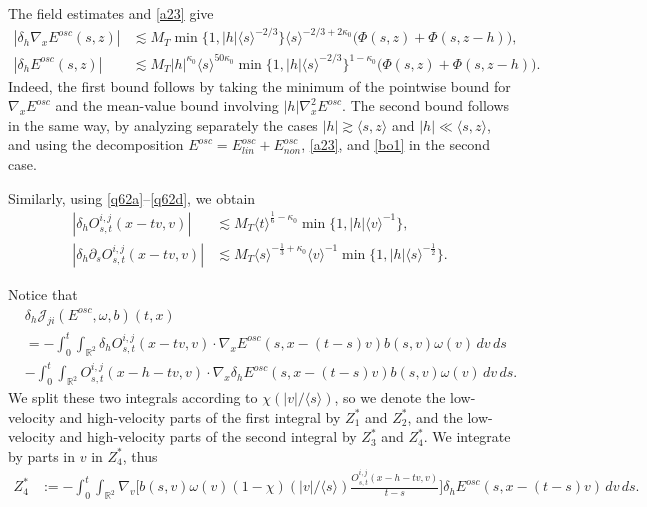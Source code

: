 \documentclass[reqno,11pt]{amsart}
\numberwithin{equation}{section}
\def\R{{\mathbb R}}
\def\R{{\bf R}}
\def\R{\mathbb{R}}
\begin{document}
The field estimates and \eqref{a23} give
\begin{equation}\label{sec5eq55}
\begin{split}
|\delta_h\nabla_xE^{osc}(s,z)|
&\lesssim M_T
\min\{1,|h|\langle s\rangle^{-2/3}\}
\langle s\rangle^{-2/3+2\kappa_0}
\big(\Phi(s,z)+\Phi(s,z-h)\big),\\
|\delta_hE^{osc}(s,z)|
&\lesssim M_T|h|^{\kappa_0}\langle s\rangle^{50\kappa_0}
\min\{1,|h|\langle s\rangle^{-2/3}\}^{1-\kappa_0}
\big(\Phi(s,z)+\Phi(s,z-h)\big).
\end{split}
\end{equation}
Indeed, the first bound follows by taking the minimum of the pointwise
bound for $\nabla_xE^{osc}$ and the mean-value bound involving
$|h|\nabla_x^2E^{osc}$. The second bound follows in the same way, by analyzing separately the cases $|h|\gtrsim \langle s,z\rangle$ and $|h|\ll\langle s,z\rangle$, and using the decomposition $E^{osc}=E^{osc}_{lin}+E^{osc}_{non}$, \eqref{a23}, and \eqref{bo1} in the second case.

Similarly, using \eqref{q62a}--\eqref{q62d}, we obtain
\begin{equation}\label{sec5eq56}
\begin{split}
|\delta_hO_{s,t}^{i,j}(x-tv,v)|&\lesssim
M_T\langle t\rangle^{\frac16-\kappa_0}
\min\{1,|h|\langle v\rangle^{-1}\},\\
|\delta_h\partial_sO_{s,t}^{i,j}(x-tv,v)|
&\lesssim M_T\langle s\rangle^{-\frac13+\kappa_0}
\langle v\rangle^{-1}
\min\{1,|h|\langle s\rangle^{-\frac12}\}.
\end{split}
\end{equation}


Notice that 
\begin{equation}\label{sec5eq57}
\begin{split}
&\delta_h\mathcal J_{ji}(E^{osc},\omega,b)(t,x)\\
&=-\int_0^t\!\!\int_{\R^2}
\delta_hO_{s,t}^{i,j}(x-tv,v)\cdot \nabla_x E^{osc}(s,x-(t-s)v)
b(s,v)\omega(v)\,dv\,ds\\
&-\int_0^t\!\!\int_{\R^2}O_{s,t}^{i,j}(x-h-tv,v)\cdot 
\nabla_x\delta_hE^{osc}(s,x-(t-s)v) b(s,v)\omega(v)\,dv\,ds.
\end{split}
\end{equation}
We split these two integrals according to $\chi(|v|/\langle s\rangle)$, so we denote the low-velocity and
high-velocity parts of the first integral by $Z^\ast_1$ and $Z^\ast_2$, 
and the low-velocity and high-velocity parts of the second integral by $Z^\ast_3$ and $Z^\ast_4$. We integrate by parts in $v$ in $Z_4^\ast$, thus
\begin{align*}
Z_4^\ast&:=-\int_0^t\!\!\int_{\R^2}
\nabla_v\Big[
b(s,v)\omega(v)(1-\chi)(|v|/\langle s\rangle)\frac{O_{s,t}^{i,j}(x-h-tv,v)}{t-s}\Big]
\delta_hE^{osc}(s,x-(t-s)v)\,dv\,ds.
\end{align*}
\end{document}
